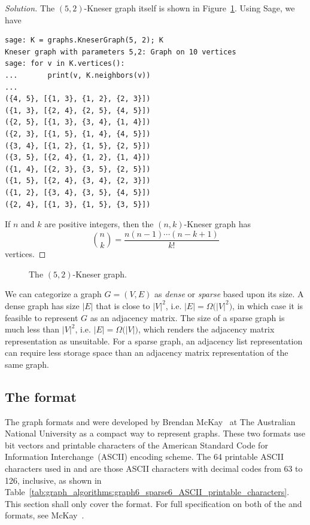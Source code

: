 \begin{proof}[Solution]
The $(5,2)$-Kneser graph itself is shown in
Figure~\ref{fig:graph_algorithms:5_2_Kneser_graph}. Using Sage, we
have
\begin{lstlisting}
sage: K = graphs.KneserGraph(5, 2); K
Kneser graph with parameters 5,2: Graph on 10 vertices
sage: for v in K.vertices():
...       print(v, K.neighbors(v))
...
({4, 5}, [{1, 3}, {1, 2}, {2, 3}])
({1, 3}, [{2, 4}, {2, 5}, {4, 5}])
({2, 5}, [{1, 3}, {3, 4}, {1, 4}])
({2, 3}, [{1, 5}, {1, 4}, {4, 5}])
({3, 4}, [{1, 2}, {1, 5}, {2, 5}])
({3, 5}, [{2, 4}, {1, 2}, {1, 4}])
({1, 4}, [{2, 3}, {3, 5}, {2, 5}])
({1, 5}, [{2, 4}, {3, 4}, {2, 3}])
({1, 2}, [{3, 4}, {3, 5}, {4, 5}])
({2, 4}, [{1, 3}, {1, 5}, {3, 5}])
\end{lstlisting}
If $n$ and $k$ are positive integers, then the
$(n,k)$-Kneser graph has
\[
\binom{n}{k}
=
\frac{n (n-1) \cdots (n - k + 1)} {k!}
\]
vertices.
\end{proof}

\begin{figure}[!htbp]
\centering
{}

\caption{The $(5,2)$-Kneser graph.}
\label{fig:graph_algorithms:5_2_Kneser_graph}
\end{figure}

We can categorize a graph $G = (V, E)$ as \emph{dense} or
\emph{sparse} based upon its size. A dense graph
has size $|E|$ that is close to $|V|^2$, i.e.
$|E| = \Omega\big(|V|^2\big)$, in which case it is feasible to
represent $G$ as an adjacency matrix. The size of a sparse
graph is much less than $|V|^2$, i.e.
$|E| = \Omega\big(|V|\big)$, which renders the adjacency
matrix representation as unsuitable. For a
sparse graph, an adjacency list representation
can require less storage space than an adjacency matrix representation
of the same graph.



\subsection{The \graphsix format}
\label{sec:graph_algorithms:graph6_format}

The graph formats \graphsix\index{\graphsix} and
\sparsesix\index{\sparsesix} were developed by Brendan
McKay~\cite{McKay2010} at The Australian
National University as a compact
way to represent graphs. These two formats use bit
vectors and printable characters of the American
Standard Code for Information Interchange~(ASCII)
encoding scheme. The 64 printable ASCII characters used in
\graphsix and \sparsesix are those ASCII characters with decimal codes
from 63 to 126, inclusive, as shown in
Table~\ref{tab:graph_algorithms:graph6_sparse6_ASCII_printable_characters}.
This section shall only cover the \graphsix format. For full
specification on both of the \graphsix and \sparsesix formats, see
McKay~\cite{McKay2010}.

